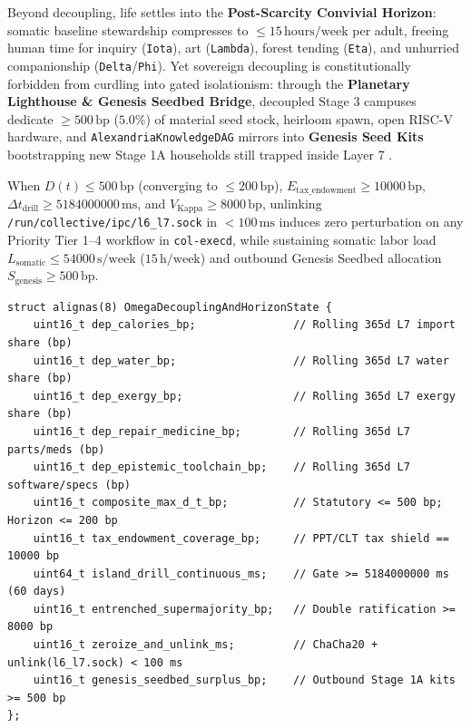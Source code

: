 Beyond decoupling, life settles into the \textbf{Post-Scarcity Convivial Horizon}: somatic baseline stewardship compresses to
$\le 15\,\mathrm{hours/week}$ per adult, freeing human time for inquiry (\texttt{Iota}), art (\texttt{Lambda}), forest tending (\texttt{Eta}), and
unhurried companionship (\texttt{Delta}/\texttt{Phi}). Yet sovereign decoupling is constitutionally forbidden from curdling into gated isolationism:
through the \textbf{Planetary Lighthouse \& Genesis Seedbed Bridge}, decoupled Stage 3 campuses dedicate $\ge 500\,\mathrm{bp}$ ($5.0\%$) of material
seed stock, heirloom spawn, open RISC-V hardware, and \texttt{AlexandriaKnowledgeDAG} mirrors into \textbf{Genesis Seed Kits} bootstrapping new Stage 1A
households still trapped inside Layer 7 \parencite{kropotkin1902,ostrom2010}.

\begin{theorem}
\label{thm:omega-decoupling}
When $D(t) \le 500\,\mathrm{bp}$ (converging to $\le 200\,\mathrm{bp}$), $E_{\mathrm{tax\_endowment}} \ge 10000\,\mathrm{bp}$,
$\Delta t_{\mathrm{drill}} \ge 5184000000\,\mathrm{ms}$, and $V_{\mathrm{Kappa}} \ge 8000\,\mathrm{bp}$, unlinking
\texttt{/run/collective/ipc/l6\_l7.sock} in $< 100\,\mathrm{ms}$ induces zero perturbation on any Priority Tier 1--4 workflow in \texttt{col-execd},
while sustaining somatic labor load $L_{\mathrm{somatic}} \le 54000\,\mathrm{s/week}$ ($15\,\mathrm{h/week}$) and outbound Genesis Seedbed allocation
$S_{\mathrm{genesis}} \ge 500\,\mathrm{bp}$.
\end{theorem}

\begin{lstlisting}[caption={Scenario \texttt{Omega} External Dependency Index $D(t)$ and \texttt{l6\_l7.sock} Sunset Gate Structs},label={lst:omega-structs}]
struct alignas(8) OmegaDecouplingAndHorizonState {
    uint16_t dep_calories_bp;               // Rolling 365d L7 import share (bp)
    uint16_t dep_water_bp;                  // Rolling 365d L7 water share (bp)
    uint16_t dep_exergy_bp;                 // Rolling 365d L7 exergy share (bp)
    uint16_t dep_repair_medicine_bp;        // Rolling 365d L7 parts/meds (bp)
    uint16_t dep_epistemic_toolchain_bp;    // Rolling 365d L7 software/specs (bp)
    uint16_t composite_max_d_t_bp;          // Statutory <= 500 bp; Horizon <= 200 bp
    uint16_t tax_endowment_coverage_bp;     // PPT/CLT tax shield == 10000 bp
    uint64_t island_drill_continuous_ms;    // Gate >= 5184000000 ms (60 days)
    uint16_t entrenched_supermajority_bp;   // Double ratification >= 8000 bp
    uint16_t zeroize_and_unlink_ms;         // ChaCha20 + unlink(l6_l7.sock) < 100 ms
    uint16_t genesis_seedbed_surplus_bp;    // Outbound Stage 1A kits >= 500 bp
};
\end{lstlisting}

